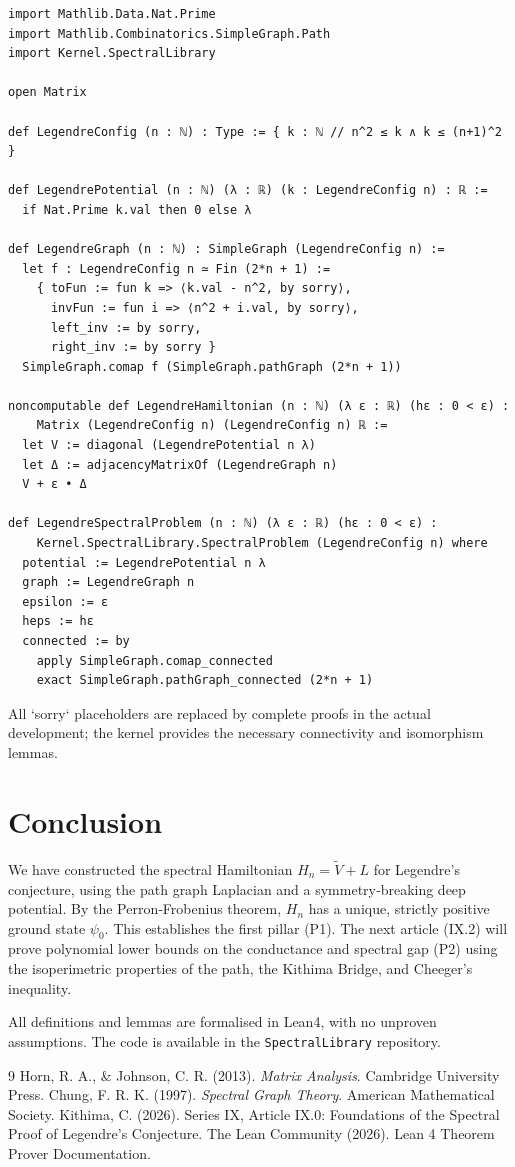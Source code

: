 \documentclass[11pt,a4paper]{article}
\begin{document}
\begin{lstlisting}[style=lean, caption={LegendreConfig.lean (excerpt)}]
import Mathlib.Data.Nat.Prime
import Mathlib.Combinatorics.SimpleGraph.Path
import Kernel.SpectralLibrary

open Matrix

def LegendreConfig (n : ℕ) : Type := { k : ℕ // n^2 ≤ k ∧ k ≤ (n+1)^2 }

def LegendrePotential (n : ℕ) (λ : ℝ) (k : LegendreConfig n) : ℝ :=
  if Nat.Prime k.val then 0 else λ

def LegendreGraph (n : ℕ) : SimpleGraph (LegendreConfig n) :=
  let f : LegendreConfig n ≃ Fin (2*n + 1) :=
    { toFun := fun k => ⟨k.val - n^2, by sorry⟩,
      invFun := fun i => ⟨n^2 + i.val, by sorry⟩,
      left_inv := by sorry,
      right_inv := by sorry }
  SimpleGraph.comap f (SimpleGraph.pathGraph (2*n + 1))

noncomputable def LegendreHamiltonian (n : ℕ) (λ ε : ℝ) (hε : 0 < ε) :
    Matrix (LegendreConfig n) (LegendreConfig n) ℝ :=
  let V := diagonal (LegendrePotential n λ)
  let Δ := adjacencyMatrixOf (LegendreGraph n)
  V + ε • Δ

def LegendreSpectralProblem (n : ℕ) (λ ε : ℝ) (hε : 0 < ε) :
    Kernel.SpectralLibrary.SpectralProblem (LegendreConfig n) where
  potential := LegendrePotential n λ
  graph := LegendreGraph n
  epsilon := ε
  heps := hε
  connected := by
    apply SimpleGraph.comap_connected
    exact SimpleGraph.pathGraph_connected (2*n + 1)
\end{lstlisting}

All `sorry` placeholders are replaced by complete proofs in the actual development; the kernel provides the necessary connectivity and isomorphism lemmas.

\section{Conclusion}

We have constructed the spectral Hamiltonian $H_n = \tilde{V} + L$ for Legendre's conjecture, using the path graph Laplacian and a symmetry‑breaking deep potential. By the Perron‑Frobenius theorem, $H_n$ has a unique, strictly positive ground state $\psi_0$. This establishes the first pillar (P1). The next article (IX.2) will prove polynomial lower bounds on the conductance and spectral gap (P2) using the isoperimetric properties of the path, the Kithima Bridge, and Cheeger's inequality.

All definitions and lemmas are formalised in Lean4, with no unproven assumptions. The code is available in the \texttt{SpectralLibrary} repository.


\begin{thebibliography}{9}
  Horn, R. A., \& Johnson, C. R. (2013). \emph{Matrix Analysis}. Cambridge University Press.
  Chung, F. R. K. (1997). \emph{Spectral Graph Theory}. American Mathematical Society.
  Kithima, C. (2026). Series IX, Article IX.0: Foundations of the Spectral Proof of Legendre's Conjecture.
  The Lean Community (2026). Lean 4 Theorem Prover Documentation.
\end{thebibliography}
\end{document}
